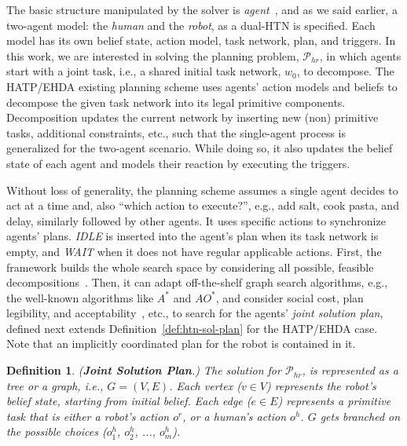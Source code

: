 \documentclass[letterpaper]{article} %
\newtheorem{definition}{Definition}
\begin{document}
The basic structure manipulated by the solver is \textit{agent}~\cite{thesisBuisan21}, and as we said earlier, a two-agent model: the \textit{human} and the \textit{robot}, as a dual-HTN is specified. 
Each model has its own belief state, action model, task network, plan, and triggers. In this work, we are interested in solving the planning problem, $\mathcal{P}_{hr}$, in which agents start with a joint task, i.e., a shared initial task network, $w_0$, to decompose.
The HATP/EHDA existing planning scheme uses agents' action models and beliefs to decompose the given task network into its legal primitive components. 
Decomposition updates the current network by inserting new (non) primitive tasks, additional constraints, etc., such that the single-agent process is generalized for the two-agent scenario.
While doing so, it also updates the belief state of each agent and models their reaction by executing the triggers.

Without loss of generality, the planning scheme assumes a single agent decides to act at a time and, also ``which action to execute?'', e.g., add salt, cook pasta, and delay, similarly followed by other agents. 
It uses specific actions to synchronize agents' plans. {\em IDLE} is inserted into the agent's plan when its task network is empty, and {\em WAIT} when it does not have regular applicable actions. First, the framework builds the whole search space by considering all possible, feasible decompositions~\cite{buisan:hal-03684211}. 
Then, it can adapt off-the-shelf graph search algorithms, e.g., the well-known algorithms like $A^*$ and $AO^*$, and consider social cost, plan legibility, and acceptability~\cite{alili2009task}, etc., to search for the agents' \textit{joint solution plan}, defined next extends Definition~\ref{def:htn-sol-plan} for the HATP/EHDA case. Note that an implicitly coordinated plan for the robot is contained in it. 

\begin{definition} \label{def:joint-sol-plan}
(\textbf{Joint Solution Plan}.) 
{The solution for $\mathcal{P}_{hr}$, is represented as a tree or a graph, i.e., $G=(V,E)$. Each vertex ($v \in V$) represents the robot's belief state, starting from initial belief. Each edge ($e \in E$) represents a primitive task that is either a robot's action $o^{r}$, or a human's action $o^{h}$. $G$ gets branched on the possible choices ($o^{h}_1$, $o^{h}_2$, ..., $o^{h}_m$). 
}  
\end{definition}
\end{document}
